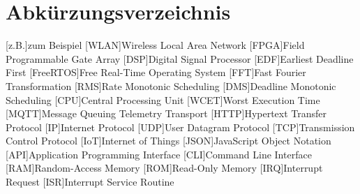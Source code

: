 \documentclass{scrartcl}
\begin{document}
	\section*{Abkürzungsverzeichnis}
	\begin{acronym}[abkuerzungen]
		{zum Beispiel}
		{Wireless Local Area Network}
		{Field Programmable Gate Array}
		[DSP]{Digital Signal Processor}
		[EDF]{Earliest Deadline First}
		[FreeRTOS]{Free Real-Time Operating System}
		[FFT]{Fast Fourier Transformation}
		[RMS]{Rate Monotonic Scheduling}
		[DMS]{Deadline Monotonic Scheduling}
		[CPU]{Central Processing Unit}
		{Worst Execution Time}
		{Message Queuing Telemetry Transport}
		{Hypertext Transfer Protocol}
		[IP]{Internet Protocol}
		[UDP]{User Datagram Protocol}
		[TCP]{Transmission Control Protocol}
		[IoT]{Internet of Things}
		{JavaScript Object Notation}
		[API]{Application Programming Interface}
		[CLI]{Command Line Interface}
		[RAM]{Random-Access Memory}
		[ROM]{Read-Only Memory}
		[IRQ]{Interrupt Request}
		[ISR]{Interrupt Service Routine}
	\end{acronym}
	\clearpage
	\listoffigures
		\clearpage
	\listoftables
		\printbibliography{}
		\clearpage
\end{document}
